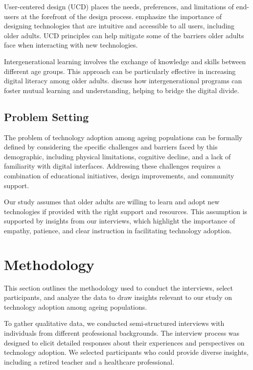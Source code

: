\documentclass{article} %
\begin{document}
User-centered design (UCD) places the needs, preferences, and limitations of end-users at the forefront of the design process. \citet{shanahan2023role} emphasize the importance of designing technologies that are intuitive and accessible to all users, including older adults. UCD principles can help mitigate some of the barriers older adults face when interacting with new technologies.

Intergenerational learning involves the exchange of knowledge and skills between different age groups. This approach can be particularly effective in increasing digital literacy among older adults. \citet{wang2023describe} discuss how intergenerational programs can foster mutual learning and understanding, helping to bridge the digital divide.

\subsection{Problem Setting}
\label{sec:problem_setting}

The problem of technology adoption among ageing populations can be formally defined by considering the specific challenges and barriers faced by this demographic, including physical limitations, cognitive decline, and a lack of familiarity with digital interfaces. Addressing these challenges requires a combination of educational initiatives, design improvements, and community support.

Our study assumes that older adults are willing to learn and adopt new technologies if provided with the right support and resources. This assumption is supported by insights from our interviews, which highlight the importance of empathy, patience, and clear instruction in facilitating technology adoption.

\section{Methodology}
\label{sec:method}

This section outlines the methodology used to conduct the interviews, select participants, and analyze the data to draw insights relevant to our study on technology adoption among ageing populations.

To gather qualitative data, we conducted semi-structured interviews with individuals from different professional backgrounds. The interview process was designed to elicit detailed responses about their experiences and perspectives on technology adoption. We selected participants who could provide diverse insights, including a retired teacher and a healthcare professional.
\end{document}

